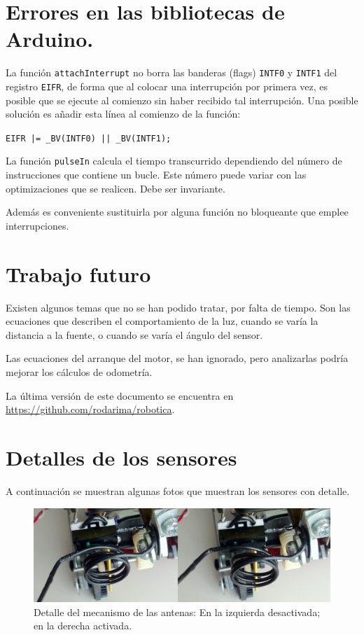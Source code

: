 \documentclass[10pt,a4paper,hidelinks,twocolumn,nobalancelastpage]{article}
\begin{document}
\section{Errores en las bibliotecas de Arduino.}

La función \texttt{attachInterrupt} no borra las banderas (flags) \texttt{INTF0} 
y \texttt{INTF1} del registro \texttt{EIFR}, de forma que al colocar una 
interrupción por primera vez, es posible que se ejecute al comienzo sin haber 
recibido tal interrupción. Una posible solución es añadir esta línea al comienzo 
de la función:

\texttt{EIFR |= \_BV(INTF0) || \_BV(INTF1);}

La función \texttt{pulseIn} calcula el tiempo transcurrido dependiendo del 
número de instrucciones que contiene un bucle. Este número puede variar con las 
optimizaciones que se realicen. Debe ser invariante.

Además es conveniente sustituirla por alguna función no bloqueante que emplee 
interrupciones.

\section{Trabajo futuro}
Existen algunos temas que no se han podido tratar, por falta de tiempo. Son las 
ecuaciones que describen el comportamiento de la luz, cuando se varía la 
distancia a la fuente, o cuando se varía el ángulo del sensor.

Las ecuaciones del arranque del motor, se han ignorado, pero analizarlas podría 
mejorar los cálculos de odometría.

La última versión de este documento se encuentra en 
\url{https://github.com/rodarima/robotica}.
\newpage

\section{Detalles de los sensores}
A continuación se muestran algunas fotos que muestran los sensores con detalle.

\begin{figure}[H]
\includegraphics[width=\columnwidth]{ants.jpg}
\caption{Detalle del mecanismo de las antenas: En la izquierda desactivada; en
la derecha activada. \label{fig:ants}}
\end{figure}
\end{document}
